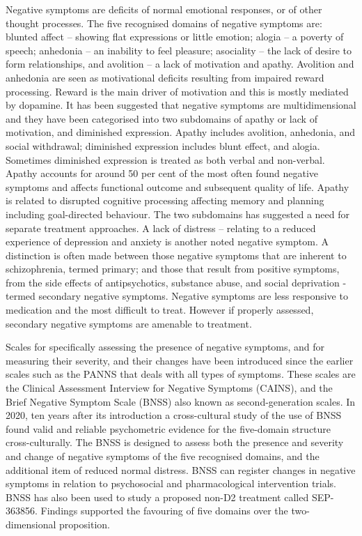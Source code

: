 Negative symptoms are deficits of normal emotional responses, or of
other thought processes. The five recognised domains of negative
symptoms are: blunted affect -- showing flat expressions or little
emotion; alogia -- a poverty of speech; anhedonia -- an inability to
feel pleasure; asociality -- the lack of desire to form relationships,
and avolition -- a lack of motivation and apathy. Avolition and
anhedonia are seen as motivational deficits resulting from impaired
reward processing. Reward is the main driver of motivation and this is
mostly mediated by dopamine. It has been suggested that negative
symptoms are multidimensional and they have been categorised into two
subdomains of apathy or lack of motivation, and diminished expression.
Apathy includes avolition, anhedonia, and social withdrawal; diminished
expression includes blunt effect, and alogia. Sometimes diminished
expression is treated as both verbal and non-verbal. Apathy accounts for
around 50 per cent of the most often found negative symptoms and affects
functional outcome and subsequent quality of life. Apathy is related to
disrupted cognitive processing affecting memory and planning including
goal-directed behaviour. The two subdomains has suggested a need for
separate treatment approaches. A lack of distress -- relating to a
reduced experience of depression and anxiety is another noted negative
symptom. A distinction is often made between those negative symptoms
that are inherent to schizophrenia, termed primary; and those that
result from positive symptoms, from the side effects of antipsychotics,
substance abuse, and social deprivation - termed secondary negative
symptoms. Negative symptoms are less responsive to medication and the
most difficult to treat. However if properly assessed, secondary
negative symptoms are amenable to treatment.

Scales for specifically assessing the presence of negative symptoms, and
for measuring their severity, and their changes have been introduced
since the earlier scales such as the PANNS that deals with all types of
symptoms. These scales are the Clinical Assessment Interview for
Negative Symptoms (CAINS), and the Brief Negative Symptom Scale (BNSS)
also known as second-generation scales. In 2020, ten years after its
introduction a cross-cultural study of the use of BNSS found valid and
reliable psychometric evidence for the five-domain structure
cross-culturally. The BNSS is designed to assess both the presence and
severity and change of negative symptoms of the five recognised domains,
and the additional item of reduced normal distress. BNSS can register
changes in negative symptoms in relation to psychosocial and
pharmacological intervention trials. BNSS has also been used to study a
proposed non-D2 treatment called SEP-363856. Findings supported the
favouring of five domains over the two-dimensional proposition.

